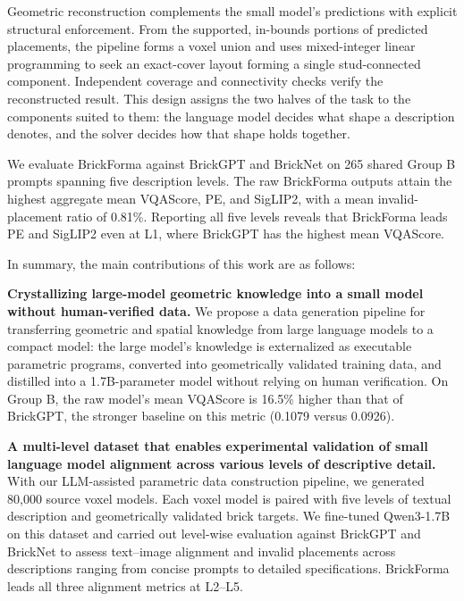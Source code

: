 Geometric reconstruction complements the small model's predictions with explicit structural enforcement. From the supported, in-bounds portions of predicted placements, the pipeline forms a voxel union and uses mixed-integer linear programming to seek an exact-cover layout forming a single stud-connected component. Independent coverage and connectivity checks verify the reconstructed result. This design assigns the two halves of the task to the components suited to them: the language model decides what shape a description denotes, and the solver decides how that shape holds together.

We evaluate BrickForma against BrickGPT and BrickNet on 265 shared Group B prompts spanning five description levels. The raw BrickForma outputs attain the highest aggregate mean VQAScore, PE, and SigLIP2, with a mean invalid-placement ratio of 0.81\%. Reporting all five levels reveals that BrickForma leads PE and SigLIP2 even at L1, where BrickGPT has the highest mean VQAScore.

In summary, the main contributions of this work are as follows:

\noindent\textbf{Crystallizing large-model geometric knowledge into a small model without human-verified data.}
We propose a data generation pipeline for transferring geometric and spatial knowledge from large language models to a compact model: the large model's knowledge is externalized as executable parametric programs, converted into geometrically validated training data, and distilled into a 1.7B-parameter model without relying on human verification. On Group B, the raw model's mean VQAScore is 16.5\% higher than that of BrickGPT, the stronger baseline on this metric (0.1079 versus 0.0926).

\noindent\textbf{A multi-level dataset that enables experimental validation of small language model alignment across various levels of descriptive detail.}
With our LLM-assisted parametric data construction pipeline, we generated 80,000 source voxel models. Each voxel model is paired with five levels of textual description and geometrically validated brick targets. We fine-tuned Qwen3-1.7B on this dataset and carried out level-wise evaluation against BrickGPT and BrickNet to assess text--image alignment and invalid placements across descriptions ranging from concise prompts to detailed specifications. BrickForma leads all three alignment metrics at L2--L5.

